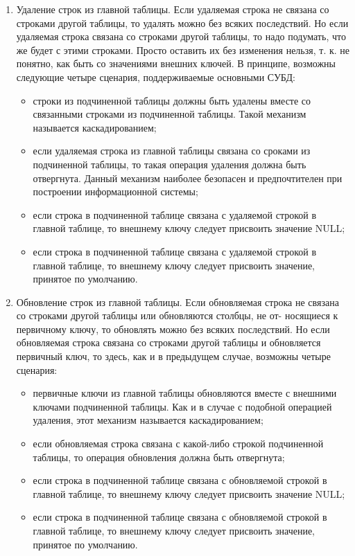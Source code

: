 \begin{enumerate}
    \item Удаление строк из главной таблицы. Если удаляемая строка не связана со строками другой таблицы, то удалять можно без всяких последствий. Но если удаляемая строка связана со строками другой таблицы, то надо подумать, что же будет с этими строками. Просто оставить их без изменения нельзя, т. к. не понятно, как быть со значениями внешних ключей. В принципе, возможны следующие четыре сценария, поддерживаемые основными СУБД:
        \begin{itemize}
            \item строки из подчиненной таблицы должны быть удалены вместе со связанными строками из подчиненной таблицы. Такой механизм называется каскадированием;
            \item если удаляемая строка из главной таблицы связана со сроками из подчиненной таблицы, то такая операция удаления должна быть отвергнута. Данный механизм наиболее безопасен и предпочтителен при построении информационной системы;
            \item если строка в подчиненной таблице связана с удаляемой строкой в главной таблице, то внешнему ключу следует присвоить значение NULL;
            \item если строка в подчиненной таблице связана с удаляемой строкой в главной таблице, то внешнему ключу следует присвоить значение, принятое по умолчанию.
        \end{itemize}
    
    \item Обновление строк из главной таблицы. Если обновляемая строка не связана со строками другой таблицы или обновляются столбцы, не от- носящиеся к первичному ключу, то обновлять можно без всяких последствий. Но если обновляемая строка связана со строками другой таблицы и обновляется первичный ключ, то здесь, как и в предыдущем случае, возможны четыре сценария:
        \begin{itemize}
            \item первичные ключи из главной таблицы обновляются вместе с внешними ключами подчиненной таблицы. Как и в случае с подобной операцией удаления, этот механизм называется каскадированием;
            \item если обновляемая строка связана с какой-либо строкой подчиненной таблицы, то операция обновления должна быть отвергнута;
            \item если строка в подчиненной таблице связана с обновляемой строкой в главной таблице, то внешнему ключу следует присвоить значение NULL;
            \item если строка в подчиненной таблице связана с обновляемой строкой в главной таблице, то внешнему ключу следует присвоить значение, принятое по умолчанию.
        \end{itemize}


\end{enumerate}
